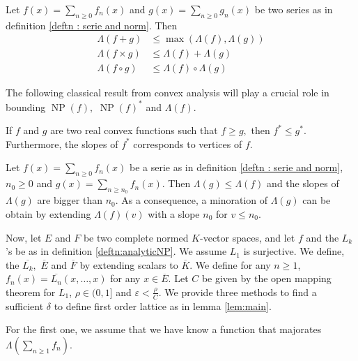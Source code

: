 \documentclass{lms}
\DeclareMathOperator{\NP}{NP}
\begin{document}
\begin{lem} Let $f(x)= \sum_{n \geq 0} f_n (x)$ and $g(x)= \sum_{n \geq 0} g_n (x)$ be two series as in definition \ref{deftn :  serie and norm}. Then
\begin{align*}
\Lambda(f+g) &\leq \max (\Lambda(f),\Lambda(g)) \\
\Lambda(f \times g) &\leq \Lambda(f)+\Lambda(g) \\
\Lambda(f \circ g) &\leq \Lambda(f) \circ \Lambda(g)
\end{align*}
\end{lem}

The following classical result from convex analysis will play a crucial role in bounding $\NP(f),$  $\NP(f)^*$ and $\Lambda(f)$.

\begin{prop} \label{prop : legendre transform}
If $f$ and $g$ are two real convex functions such that $f \geq g,$ then $f^* \leq g^*.$
Furthermore, the slopes of $f^*$ corresponds to vertices of $f$.
\end{prop}

\begin{cor} \label{cor : trunc series}
Let $f(x)= \sum_{n \geq 0} f_n (x)$ be a serie as in definition \ref{deftn :  serie and norm}, $n_0 \geq 0$ and $g(x)= \sum_{n \geq n_0} f_n (x).$ Then $\Lambda(g) \leq \Lambda(f)$ and the slopes of $\Lambda(g)$ are bigger than $n_0$. 
As a consequence, a minoration of $\Lambda(g)$ can be obtain by extending $\Lambda(f)(v)$ with a slope $n_0$ for $v \leq n_0$.
\end{cor}


Now, let $E$ and $F$ be two complete normed $K$-vector spaces, and let $f$ and the $L_k$'s be as in definition \ref{deftn:analyticNP}. We assume $L_1$ is surjective. We define, the $\overline{L_k},$ $\overline{E}$ and $\overline{F}$ by extending scalars to $\overline{K}.$ We define for any $n \geq 1$, $f_n(x)=\overline{L_n}(x,\dots,x)$ for any $x \in \overline{E}.$ 
Let $C$ be given by the open mapping theorem for $L_1$, $\rho \in (0, 1]$ and $\varepsilon < \frac{\rho}{C}$. We provide three methods to find a sufficient $\delta$ to define first order lattice as in lemma \ref{lem:main}.

For the first one, we assume that we have know a function that majorates $\Lambda(\sum_{n \geq 1}f_n)$.
\end{document}
